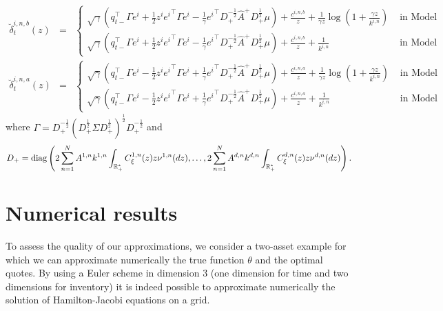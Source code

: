 \documentclass[preprint, 3p]{elsarticle}
\newcommand{\1}{{\chi}}
\begin{document}
\begin{eqnarray*}
	\breve\delta^{i,n,b}_t(z) &=& \begin{cases}
 \sqrt{\gamma} \left( q_{t-}^\intercal \Gamma e^i + \frac 12 z^i
     {e^i}^\intercal \Gamma e^i - \frac 1 \gamma {e^i}^\intercal D_+^{-\frac 12}
     \widehat A^+ D_+^{\frac 12} \mu \right) + \frac{c^{i,n,b}}{z}
 +\frac{1}{\gamma z}\log\left(1+\frac{\gamma z}{k^{i,n}}\right) &\mbox{ in Model A,}\\
 \sqrt{\gamma} \left( q_{t-}^\intercal \Gamma e^i + \frac 12 z^i
     {e^i}^\intercal \Gamma e^i - \frac 1 \gamma {e^i}^\intercal D_+^{-\frac 12}
     \widehat A^+ D_+^{\frac 12} \mu \right) + \frac{c^{i,n,b}}{z} +\frac{1}{k^{i,n}} &\mbox{ in  Model B.}
\end{cases}\\
	\breve\delta^{i,n,a}_t(z) &=& \begin{cases}
 \sqrt{\gamma} \left( q_{t-}^\intercal \Gamma e^i - \frac 12 z^i
     {e^i}^\intercal \Gamma e^i + \frac 1 \gamma {e^i}^\intercal D_+^{-\frac 12}
     \widehat A^+ D_+^{\frac 12} \mu \right) + \frac{c^{i,n,a}}{z}
 +\frac{1}{\gamma z}\log\left(1+\frac{\gamma z}{k^{i,n}}\right) &\mbox{ in Model A,}\\
 \sqrt{\gamma} \left( q_{t-}^\intercal \Gamma e^i - \frac 12 z^i
     {e^i}^\intercal \Gamma e^i + \frac 1 \gamma {e^i}^\intercal D_+^{-\frac 12}
     \widehat A^+ D_+^{\frac 12} \mu \right) + \frac{c^{i,n,a}}{z} +\frac{1}{k^{i,n}} &\mbox{ in  Model B.}
\end{cases}
	\end{eqnarray*}
where $\Gamma=D_+^{-\frac 1 2}(D_+^{\frac 12}\Sigma D_+^{\frac 12})^{\frac 12} D_+^{-\frac 1 2}$ and $$D_+=\textup{diag}\left(2 \sum_{n=1}^N A^{1,n} k^{1,n} \int_{\mathbb R ^*_+}C_\xi^{1,n}(z)  z \nu^{1,n}(dz) ,\ldots, 2 \sum_{n=1}^N A^{d,n} k^{d,n} \int_{\mathbb R ^*_+} C_\xi^{d,n}(z)  z  \nu^{d,n}(dz)\right).$$

\section{Numerical results}
\label{num_sec}
To assess the quality of our approximations, we consider a two-asset example for which we can approximate numerically the true function $\theta$ and the optimal quotes. By using a Euler scheme in dimension 3 (one dimension for time and two dimensions for inventory) it is indeed possible to approximate numerically the solution of Hamilton-Jacobi equations on a grid.\\
\end{document}
